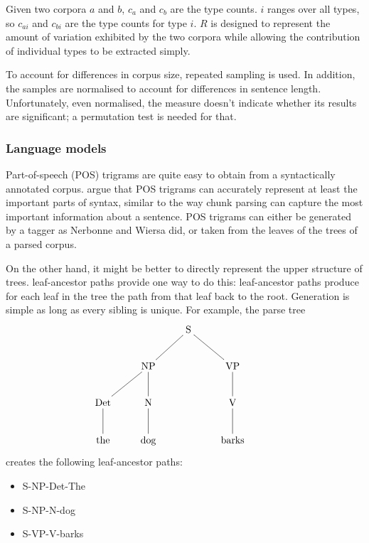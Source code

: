 \documentclass[11pt]{article}
\begin{document}
\noindent{}Given two corpora $a$ and $b$, $c_a$ and $c_b$ are the type
counts. $i$ ranges over all types, so $c_{ai}$ and $c_{bi}$ are the
type counts for type $i$.  $R$ is designed to represent the amount of
variation exhibited by the two corpora while allowing the contribution
of individual types to be extracted simply.

To account for differences in corpus size, repeated sampling is
used. In addition, the samples are normalised to account for
differences in sentence length.  Unfortunately, even normalised, the
measure doesn't indicate whether its results are significant; a
permutation test is needed for that.


\subsubsection{Language models}
Part-of-speech (POS) trigrams are quite easy to obtain from a syntactically
annotated corpus.  argue that POS trigrams
can accurately represent at least the important parts of syntax,
similar to the way chunk parsing can capture the most important
information about a sentence. POS trigrams can either be generated by
a tagger as Nerbonne and Wiersa did, or taken from the leaves of
the trees of a parsed corpus.

On the other hand, it might be better to directly represent the upper
structure of trees.  leaf-ancestor paths provide
one way to do this: leaf-ancestor paths produce for each leaf in the
tree the path from that leaf back to the root. Generation is
simple as long as every sibling is unique. For example, the parse tree
\[\xymatrix{
  &&\textrm{S} \ar@{-}[dl] \ar@{-}[dr] &&\\
  &\textrm{NP} \ar@{-}[d] \ar@{-}[dl] &&\textrm{VP} \ar@{-}[d]\\
  \textrm{Det} \ar@{-}[d] & \textrm{N} \ar@{-}[d] && \textrm{V} \ar@{-}[d] \\
\textrm{the}& \textrm{dog} && \textrm{barks}\\}
\]
creates the following leaf-ancestor paths:

\begin{itemize}
\item S-NP-Det-The
\item S-NP-N-dog
\item S-VP-V-barks
\end{itemize}
\end{document}
